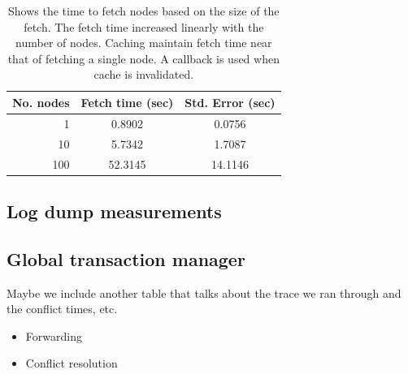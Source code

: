 \begin{table}
\label{tab:qrscans}
\begin{center}
  \begin{tabular}{| r | c  c | }
    \hline
    {\bf No. nodes } & {\bf Fetch time (sec) } & {\bf Std. Error (sec)} \\ \hline
    1 & 0.8902 & 0.0756 \\ \hline
    10 & 5.7342 & 1.7087 \\ \hline
    100 & 52.3145 & 14.1146 \\ 
    \hline
  \end{tabular}
\caption{Shows the time to fetch nodes based on the size of the fetch.  The fetch time
increased linearly with the number of nodes.  Caching maintain fetch time near
that of fetching a single node.  A callback is used when cache is invalidated.}
\end{center}
\end{table}

\subsection{Log dump measurements}


\subsection{Global transaction manager}
Maybe we include another table that talks about the trace we ran through and the conflict times, etc.

\begin{itemize}
\item Forwarding
\item Conflict resolution
\end{itemize}









